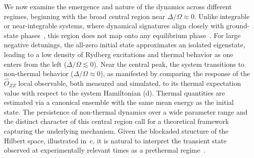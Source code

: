 \documentclass[english,floatfix,twocolumn,showpacs, aps, prx, reprint, superscriptaddress, longbibliography]{revtex4-2}
\begin{document}
We now examine the emergence and nature of the dynamics across different regimes, beginning with the broad central region near $\Delta / \Omega \approx 0$. Unlike integrable or near-integrable systems, where dynamical signatures align closely with ground-state phases~\cite{Heyl:2013,Titum:2019,Haldar:2021}, this region does not map onto any equilibrium phase~\cite{Keesling:2019}. For large negative detunings, the all-zero initial state approximates an isolated eigenstate, leading to a low density of Rydberg excitations and thermal behavior as one enters from the left ($\Delta / \Omega \lesssim 0$). Near the central peak, the system transitions to non-thermal behavior ($\Delta / \Omega \approx 0$), as manifested by comparing the response of the $\hat{O}_{ZZ}$ local observable, both measured and simulated, to its thermal expectation value with respect to the system Hamiltonian (d). Thermal quantities are estimated via a canonical ensemble with the same mean energy as the initial state. The persistence of non-thermal dynamics over a wide parameter range and the distinct character of this central region call for a theoretical framework capturing the underlying mechanism. Given the blockaded structure of the Hilbert space, illustrated in~c, it is natural to interpret the transient state observed at experimentally relevant times as a prethermal regime~\cite{Berges:2004, Moeckel:2008, Abanin:2017, Mori:2018}.
\end{document}
